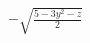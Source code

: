 \documentclass[preview]{standalone}
\begin{document}
\begin{center}
$-\sqrt{\frac{5-3y^2-z}{2}}$
\end{center}
\end{document}

